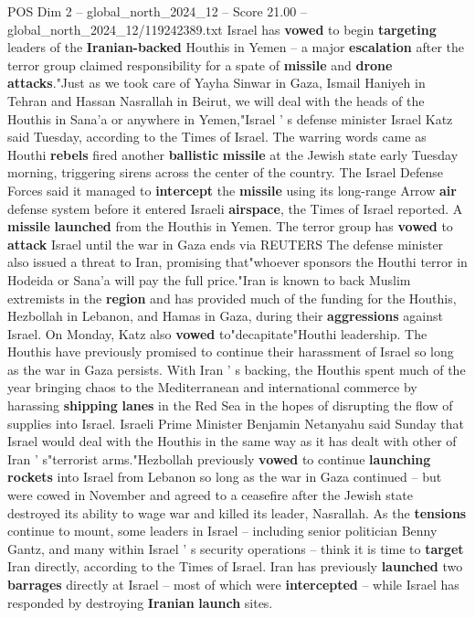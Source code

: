 \begin{textsample}{POS Dim 2 – global\_north\_2024\_12 – Score 21.00 – global\_north\_2024\_12/119242389.txt}  \label{ex:f2_pos_275}
Israel has \textbf{vowed} to begin \textbf{targeting} leaders of the \textbf{Iranian-backed} Houthis in Yemen -- a major \textbf{escalation} after the terror group claimed responsibility for a spate of \textbf{missile} and \textbf{drone} \textbf{attacks}."Just as we took care of Yayha Sinwar in Gaza, Ismail Haniyeh in Tehran and Hassan Nasrallah in Beirut, we will deal with the heads of the Houthis in Sana'a or anywhere in Yemen,"Israel ' s defense minister Israel Katz said Tuesday, according to the Times of Israel.
The warring words came as Houthi \textbf{rebels} fired another \textbf{ballistic} \textbf{missile} at the Jewish state early Tuesday morning, triggering sirens across the center of the country.
The Israel Defense Forces said it managed to \textbf{intercept} the \textbf{missile} using its long-range Arrow \textbf{air} defense system before it entered Israeli \textbf{airspace}, the Times of Israel reported.
A \textbf{missile} \textbf{launched} from the Houthis in Yemen.
The terror group has \textbf{vowed} to \textbf{attack} Israel until the war in Gaza ends via REUTERS The defense minister also issued a threat to Iran, promising that"whoever sponsors the Houthi terror in Hodeida or Sana'a will pay the full price."Iran is known to back Muslim extremists in the \textbf{region} and has provided much of the funding for the Houthis, Hezbollah in Lebanon, and Hamas in Gaza, during their \textbf{aggressions} against Israel.
On Monday, Katz also \textbf{vowed} to"decapitate"Houthi leadership.
The Houthis have previously promised to continue their harassment of Israel so long as the war in Gaza persists.
With Iran ' s backing, the Houthis spent much of the year bringing chaos to the Mediterranean and international commerce by harassing \textbf{shipping} \textbf{lanes} in the Red Sea in the hopes of disrupting the flow of supplies into Israel.
Israeli Prime Minister Benjamin Netanyahu said Sunday that Israel would deal with the Houthis in the same way as it has dealt with other of Iran ' s"terrorist arms."Hezbollah previously \textbf{vowed} to continue \textbf{launching} \textbf{rockets} into Israel from Lebanon so long as the war in Gaza continued -- but were cowed in November and agreed to a ceasefire after the Jewish state destroyed its ability to wage war and killed its leader, Nasrallah.
As the \textbf{tensions} continue to mount, some leaders in Israel -- including senior politician Benny Gantz, and many within Israel ' s security operations -- think it is time to \textbf{target} Iran directly, according to the Times of Israel.
Iran has previously \textbf{launched} two \textbf{barrages} directly at Israel -- most of which were \textbf{intercepted} -- while Israel has responded by destroying \textbf{Iranian} \textbf{launch} sites.

\end{textsample}

